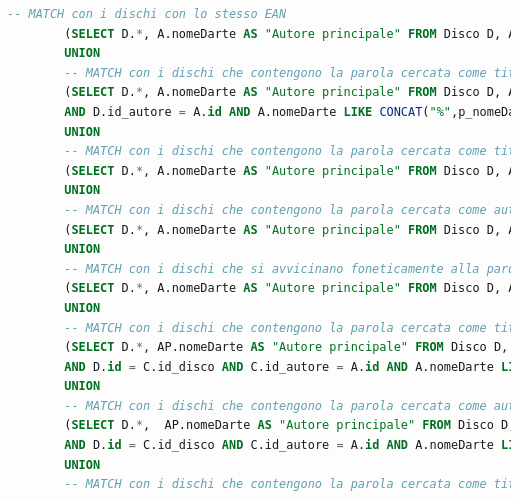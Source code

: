 \documentclass{article}
\begin{document}
\begin{lstlisting}[language=SQL]
        -- MATCH con i dischi con lo stesso EAN
        (SELECT D.*, A.nomeDarte AS "Autore principale" FROM Disco D, Autore A WHERE D.EAN = p_EAN AND A.id = D.id_autore ) 
        UNION
        -- MATCH con i dischi che contengono la parola cercata come titolo e come autore principale
        (SELECT D.*, A.nomeDarte AS "Autore principale" FROM Disco D, Autore A WHERE D.titolo LIKE CONCAT("%",p_titolo,"%") 
        AND D.id_autore = A.id AND A.nomeDarte LIKE CONCAT("%",p_nomeDarte,"%"))
        UNION
        -- MATCH con i dischi che contengono la parola cercata come titolo e si avvicinano foneticamente alla parola cercata come autore nell'autore principale
        (SELECT D.*, A.nomeDarte AS "Autore principale" FROM Disco D, Autore A WHERE D.titolo LIKE CONCAT("%",p_titolo,"%") AND A.id = D.id_autore AND soundex(soundex(A.nomeDarte)) = soundex(soundex(p_nomeDarte)))
        UNION
        -- MATCH con i dischi che contengono la parola cercata come autore nell'autore principale e si avvicinano foneticamente alla parola cercata come titolo nel titolo
        (SELECT D.*, A.nomeDarte AS "Autore principale" FROM Disco D, Autore A WHERE soundex(soundex(D.titolo)) = soundex(soundex(p_titolo)) AND D.id_autore = A.id AND A.nomeDarte LIKE CONCAT("%",p_nomeDarte,"%"))
        UNION
        -- MATCH con i dischi che si avvicinano foneticamente alla parola cercata sia come titolo nel titolo che come autore nell'autore principale
        (SELECT D.*, A.nomeDarte AS "Autore principale" FROM Disco D, Autore A WHERE soundex(soundex(D.titolo)) = soundex(soundex(p_titolo)) AND D.id_autore = A.id AND soundex(soundex(A.nomeDarte)) = soundex(soundex(p_nomeDarte)))
        UNION
        -- MATCH con i dischi che contengono la parola cercata come titolo e come autore secondario
        (SELECT D.*, AP.nomeDarte AS "Autore principale" FROM Disco D, Collabora C, Autore A, Autore AP WHERE D.titolo LIKE CONCAT("%",p_titolo,"%") 
        AND D.id = C.id_disco AND C.id_autore = A.id AND A.nomeDarte LIKE CONCAT("%",p_nomeDarte,"%") AND AP.id = D.id_autore)
        UNION 
        -- MATCH con i dischi che contengono la parola cercata come autore nell'autore secondario e si avvicinano foneticamente alla parola cercata come titolo nel titolo
        (SELECT D.*,  AP.nomeDarte AS "Autore principale" FROM Disco D, Collabora C, Autore A, Autore AP WHERE soundex(soundex(D.titolo)) = soundex(soundex(p_titolo)) 
        AND D.id = C.id_disco AND C.id_autore = A.id AND A.nomeDarte LIKE CONCAT("%",p_nomeDarte,"%") AND AP.id = D.id_autore) 
        UNION
        -- MATCH con i dischi che contengono la parola cercata come titolo nel titolo e si avvicinano foneticamente alla parola cercata come autore nell'autore secondario

\end{lstlisting}
\end{document}

